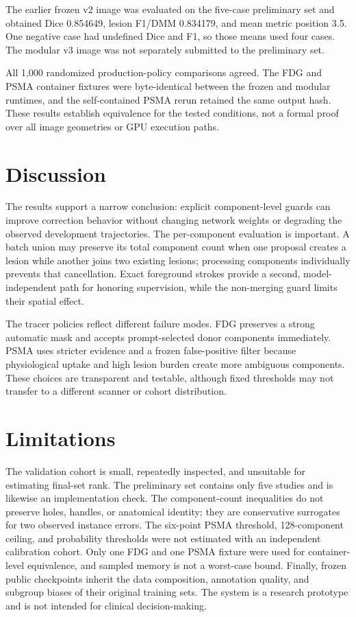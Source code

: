 \documentclass[runningheads]{llncs}
\begin{document}
The earlier frozen v2 image was evaluated on the five-case preliminary set and
obtained Dice 0.854649, lesion F1/DMM 0.834179, and mean metric position 3.5.
One negative case had undefined Dice and F1, so those means used four cases.
The modular v3 image was not separately submitted to the preliminary set.

All 1,000 randomized production-policy comparisons agreed. The FDG and PSMA
container fixtures were byte-identical between the frozen and modular
runtimes, and the self-contained PSMA rerun retained the same output hash.
These results establish equivalence for the tested conditions, not a formal
proof over all image geometries or GPU execution paths.

\section{Discussion}

The results support a narrow conclusion: explicit component-level guards can
improve correction behavior without changing network weights or degrading the
observed development trajectories. The per-component evaluation is important.
A batch union may preserve its total component count when one proposal creates
a lesion while another joins two existing lesions; processing components
individually prevents that cancellation. Exact foreground strokes provide a
second, model-independent path for honoring supervision, while the
non-merging guard limits their spatial effect.

The tracer policies reflect different failure modes. FDG preserves a strong
automatic mask and accepts prompt-selected donor components immediately. PSMA
uses stricter evidence and a frozen false-positive filter because physiological
uptake and high lesion burden create more ambiguous components. These choices
are transparent and testable, although fixed thresholds may not transfer to a
different scanner or cohort distribution.

\section{Limitations}

The validation cohort is small, repeatedly inspected, and unsuitable for
estimating final-set rank. The preliminary set contains only five studies and
is likewise an implementation check. The component-count inequalities do not
preserve holes, handles, or anatomical identity; they are conservative
surrogates for two observed instance errors. The six-point PSMA threshold,
128-component ceiling, and probability thresholds were not estimated with an
independent calibration cohort. Only one FDG and one PSMA fixture were used for
container-level equivalence, and sampled memory is not a worst-case bound.
Finally, frozen public checkpoints inherit the data composition, annotation
quality, and subgroup biases of their original training sets. The system is a
research prototype and is not intended for clinical decision-making.
\end{document}
